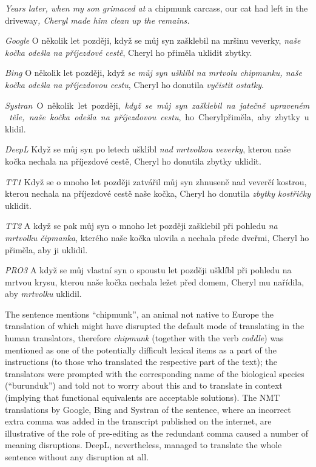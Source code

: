 \documentclass[output=paper]{langscibook}
\begin{document}
\ea \label{ex:kamenicka:8}

\textit{Years later, when my son grimaced at} a chipmunk carcass, our cat had left in the driveway\textit{, Cheryl made him clean up the remains.}

\textit{Google} O několik let později, když se můj syn zašklebil na mršinu veverky, \textit{naše kočka odešla na příjezdové cestě}, Cheryl ho přiměla uklidit zbytky.

\textit{Bing} O několik let později, když \textit{se můj syn ušklíbl na mrtvolu chipmunku, naše kočka odešla na příjezdovou cestu}, Cheryl ho donutila \textit{vyčistit ostatky}.

\textit{Systran~}O~několik~let~později,~\textit{když~se~můj~syn~zašklebil~na~jatečně~upraveném~těle,~naše~kočka~odešla~na~příjezdovou~cestu},~ho~Cherylpřiměla,~aby~zbytky~uklidil.

\textit{DeepL} Když se můj syn po letech ušklíbl \textit{nad mrtvolkou veverky}, kterou naše kočka nechala na příjezdové cestě, Cheryl ho donutila zbytky uklidit.

\textit{TT1} Když se o mnoho let později zatvářil můj syn zhnuseně nad veverčí kostrou, kterou nechala na příjezdové cestě naše kočka, Cheryl ho donutila \textit{zbytky kostřičky} uklidit.

\textit{TT2} A když se pak můj syn o mnoho let později zašklebil při pohledu \textit{na mrtvolku čipmanka}, kterého naše kočka ulovila a nechala přede dveřmi, Cheryl ho přiměla, aby ji uklidil.

\textit{PRO3} A když se můj vlastní syn o spoustu let později ušklíbl při pohledu na mrtvou krysu, kterou naše kočka nechala ležet před domem, Cheryl mu nařídila, aby \textit{mrtvolku} uklidil.

\z
The sentence mentions “chipmunk”, an animal not native to Europe the translation of which might have disrupted the default mode of translating in the human translators, therefore \textit{chipmunk} (together with the verb \textit{coddle}) was mentioned as one of the potentially difficult lexical items as a part of the instructions (to those who translated the respective part of the text); the translators were prompted with the corresponding name of the biological species (“burunduk”) and told not to worry about this and to translate in context (implying that functional equivalents are acceptable solutions). The NMT translations by Google, Bing and Systran of the sentence, where an incorrect extra comma was added in the transcript published on the internet, are illustrative of the role of pre-editing as the redundant comma caused a number of meaning disruptions. DeepL, nevertheless, managed to translate the whole sentence without any disruption at all.
\end{document}
